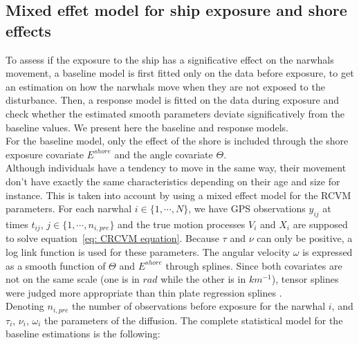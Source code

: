 \documentclass[11pt]{article}
\newcommand {\1}{\mathbb{1}}
\theoremstyle{definition}
\theoremstyle{remark}
\theoremstyle{remark}
\begin{document}
\subsection{Mixed effet model for ship exposure and shore effects}
\label{subsection: ship exposure effect}


To assess if the exposure to the ship has a significative effect on the narwhals movement, a baseline model is first fitted only on the data before exposure, to get an estimation on how the narwhals move when they are not exposed to the disturbance. Then, a response model is fitted on the data during exposure and check whether the estimated smooth parameters deviate significatively from the baseline values. We present here the baseline and response models.\\

For the baseline model, only the effect of the shore is included through the shore exposure covariate $E^{shore}$ and the angle covariate $\Theta$.\\
Although individuals have a tendency to move in the same way, their movement don't have exactly the same characteristics depending on their age and size for instance. This is taken into account by using a mixed effect model for the RCVM parameters.
For each narwhal $i \in \{1, \cdots, N\}$, we have 	GPS observations $y_{ij}$ at times $t_{ij}$, $j \in \{1,\cdots,n_{i,pre}\}$ and the true motion processes $V_i$ and $X_i$ are supposed to solve equation~\ref{eq: CRCVM equation}. Because $\tau$ and $\nu$ can only be positive, a log link function is used for these parameters. The angular velocity $\omega$ is expressed as a smooth function of $\Theta$ and $E^{shore}$ through splines. Since both covariates are not on the same scale (one is in $rad$ while the other is in $km^{-1}$), tensor splines were judged more appropriate than thin plate regression splines \cite{wood_generalized_2017}.\\

Denoting $n_{i,pre}$ the number of observations before exposure for the narwhal $i$, and $\tau_i$, $\nu_i$, $\omega_i$ the parameters of the diffusion. The complete statistical model for the baseline estimations is the following:
\end{document}
